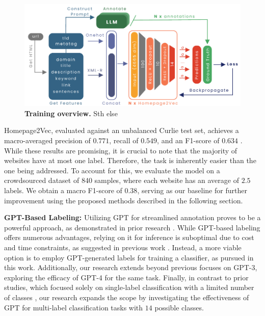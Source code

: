 \begin{figure}[!ht]
    \centering
    \includegraphics[height=0.2\textheight, width=\columnwidth]{./figures/training_overview.pdf}
    \caption{\textbf{Training overview.} Sth else}
    \label{fig:train-overview}
\end{figure}

Homepage2Vec, evaluated against an unbalanced Curlie test set, achieves a macro-averaged precision of $0.771$, recall of $0.549$, and an F1-score of $0.634$ \cite{homepage2vec}. While these results are promising, it is crucial to note that the majority of websites have at most one label. Therefore, the task is inherently easier than the one being addressed. To account for this, we evaluate the model on a crowdsourced dataset of 840 samples, where each website has an average of $2.5$ labels. We obtain a macro F1-score of $0.38$, serving as our baseline for further improvement using the proposed methods described in the following section.

\textbf{GPT-Based Labeling:} Utilizing GPT for streamlined annotation proves to be a powerful approach, as demonstrated in prior research \cite{reduce-labeling-cost, prompt-tuning, is-gpt3-good-annot, annollm}. While GPT-based labeling offers numerous advantages, relying on it for inference is suboptimal due to cost and time constraints, as suggested in previous work \cite{reduce-labeling-cost, is-gpt3-good-annot}. Instead, a more viable option is to employ GPT-generated labels for training a classifier, as pursued in this work. Additionally, our research extends beyond previous focuses on GPT-3, exploring the efficacy of GPT-4 for the same task. Finally, in contrast to prior studies, which focused solely on single-label classification with a limited number of classes \cite{reduce-labeling-cost, is-gpt3-good-annot}, our research expands the scope by investigating the effectiveness of GPT for multi-label classification tasks with $14$ possible classes.
